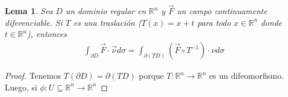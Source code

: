 \documentclass{report}
\newcommand{\realNumbers}{\mathbb{R}}
\newtheorem{lemma}{Lema}
\theoremstyle{remark}
\begin{document}
  \begin{lemma}
    Sea \(D\) un dominio regular en \(\realNumbers^n\) y \(\vec{F}\) un campo continuamente diferenciable.
    Si \(T\) es una traslación (\(T(x) = x + t\) para todo \(x \in \realNumbers^n\) donde \(t \in \realNumbers^n\)), entonces
    \begin{align}
      \int_{\partial D} \vec{F} \cdot \vec{\nu} d \sigma
      =
      \int_{\partial (T D)} (\vec{F} \circ T^{- 1}) \cdot \nu d \sigma
    \end{align}
  \end{lemma}
  \begin{proof}
    Tenemos \(T(\partial D) = \partial (T D)\) porque \(T : \realNumbers^n \rightarrow \realNumbers^n\) es un difeomorfismo.
    Luego, si \(\phi : U \subseteq \realNumbers^n \rightarrow \realNumbers^n\)

  
  
  \end{proof}
\end{document}
